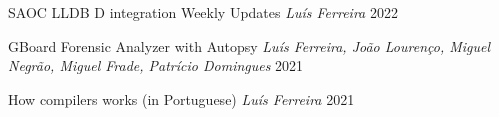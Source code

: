 

\begin{cvhonors}

  \cvhonor
    {SAOC LLDB D integration Weekly Updates} %
    {\scriptsize \textit{Luís Ferreira}} %
    {\color{gray}\href{https://lsferreira.net/posts/d-saoc-2021-01/}{\faLink\acvHeaderIconSep\@Link}}
    {2022} %

  \cvhonor
    {GBoard Forensic Analyzer with Autopsy} %
    {\scriptsize \textit{Luís Ferreira, João Lourenço, Miguel Negrão, Miguel Frade, Patrício Domingues}} %
    {\color{gray}\href{https://lsferreira.net/public/school/presentations/gboard/}{\faLink\acvHeaderIconSep\@Link}}
    {2021} %

  \cvhonor
    {How compilers works \scriptsize (in Portuguese)} %
    {\scriptsize \textit{Luís Ferreira}} %
    {\color{gray}\href{https://lsferreira.net/public/school/presentations/compilers/}{\faLink\acvHeaderIconSep\@Link}}
    {2021} %

\end{cvhonors}

